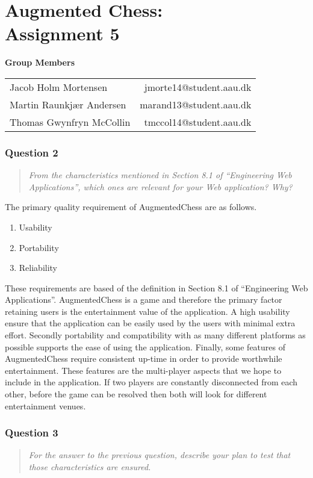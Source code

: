 \documentclass[10pt,a4paper]{report}
\begin{document}
\chapter{Augmented Chess:\\ Assignment 5}

\begin{center}
{\Large \textbf{Group Members}}

\begin{tabular}{l r}
Jacob Holm Mortensen		&	jmorte14@student.aau.dk\\
Martin Raunkjær Andersen	&	marand13@student.aau.dk\\
Thomas Gwynfryn McCollin	&	tmccol14@student.aau.dk
\end{tabular}
\end{center}

\subsection*{Question 2}
\begin{quote}
	\textit{From the characteristics mentioned in Section 8.1 of “Engineering Web Applications”, which ones are relevant for your Web application? Why?}
\end{quote}

The primary quality requirement of AugmentedChess are as follows.
\begin{enumerate}
	\item Usability
	\item Portability
	\item Reliability
\end{enumerate}
These requirements are based of the definition in Section 8.1 of “Engineering Web Applications”. AugmentedChess is a game and therefore the primary factor retaining users is the entertainment value of the application. A high usability ensure that the application can be easily used by the users with minimal extra effort. Secondly portability and compatibility with as many different platforms as possible supports the ease of using the application. Finally, some features of AugmentedChess require consistent up-time in order to provide worthwhile entertainment. These features are the multi-player aspects that we hope to include in the application. If two players are constantly disconnected from each other, before the game can be resolved then both will look for different entertainment venues.

\subsection*{Question 3}
\begin{quote}
 \textit{For the answer to the previous question, describe your plan to test that those characteristics are ensured.}
\end{quote}
\end{document}
